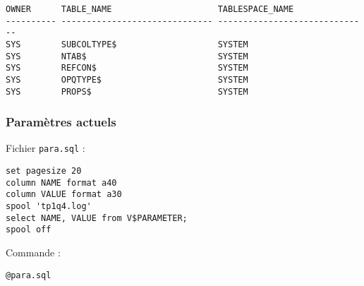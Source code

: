 \documentclass[a4paper, oneside, 12pt]{article}
\begin{document}
\begin{verbatim}
OWNER      TABLE_NAME                     TABLESPACE_NAME                       
---------- ------------------------------ ------------------------------        
SYS        SUBCOLTYPE$                    SYSTEM                                
SYS        NTAB$                          SYSTEM                                
SYS        REFCON$                        SYSTEM                                
SYS        OPQTYPE$                       SYSTEM                                
SYS        PROPS$                         SYSTEM                             
\end{verbatim}

\subsubsection{Paramètres actuels}

Fichier \texttt{para.sql} :
\begin{verbatim}
set pagesize 20
column NAME format a40
column VALUE format a30
spool 'tp1q4.log'
select NAME, VALUE from V$PARAMETER;
spool off
\end{verbatim}

Commande :
\begin{verbatim}
@para.sql
\end{verbatim}
\end{document}
